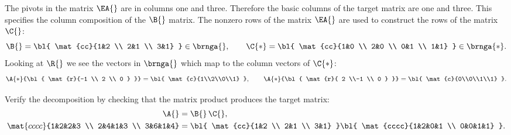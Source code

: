 The pivots in the matrix $\EA{}$ are in columns one and three. Therefore the basic columns of the target matrix are one and three. This specifies the column composition of the $\B{}$ matrix. The nonzero rows of the matrix $\EA{}$ are used to construct the rows of the matrix $\C{}$:
\begin{equation}
  \B{}  = {\bl{ \mat{cc}{1&2 \\ 2&1 \\ 3&1} }} \in \brnga{}, \qquad 
  \C{*} = {\bl{ \mat{cc}{1&0 \\ 2&0 \\ 0&1 \\ 1&1} }} \in \brnga{*}.
\end{equation}
Looking at $\R{}$ we see the vectors in $\brnga{}$ which map to the column vectors of $\C{*}$:
\begin{equation}
  \A{*} {\bl{ \mat{r}{-1 \\ 2 \\ 0 } }} = {\bl{ \mat{c}{1\\2\\0\\1} }}, \qquad
  \A{*} {\bl{ \mat{r}{ 2 \\-1 \\ 0 } }} = {\bl{ \mat{c}{0\\0\\1\\1} }}.
\end{equation}

 
Verify the decomposition by checking that the matrix product produces the target matrix:
\begin{equation}
  \begin{split}
    \A{} &= \B{}\,\C{},\\
    \mat{cccc}{1&2&2&3 \\ 2&4&1&3 \\ 3&6&1&4}
         &= {\bl{ \mat{cc}{1&2 \\ 2&1 \\ 3&1} }}
            {\bl{ \mat{cccc}{1&2&0&1 \\ 0&0&1&1} }}.
  \end{split}
\end{equation}

